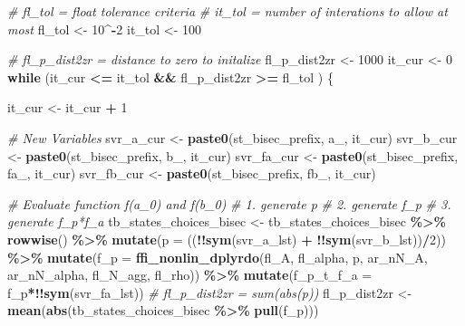 \documentclass[
]{book}
\newenvironment{Shaded}{\begin{snugshade}}{\end{snugshade}}
\newcommand{\CommentTok}[1]{\textcolor[rgb]{0.56,0.35,0.01}{\textit{#1}}}
\newcommand{\ControlFlowTok}[1]{\textcolor[rgb]{0.13,0.29,0.53}{\textbf{#1}}}
\newcommand{\DataTypeTok}[1]{\textcolor[rgb]{0.13,0.29,0.53}{#1}}
\newcommand{\DecValTok}[1]{\textcolor[rgb]{0.00,0.00,0.81}{#1}}
\newcommand{\KeywordTok}[1]{\textcolor[rgb]{0.13,0.29,0.53}{\textbf{#1}}}
\newcommand{\NormalTok}[1]{#1}
\newcommand{\OperatorTok}[1]{\textcolor[rgb]{0.81,0.36,0.00}{\textbf{#1}}}
\newcommand{\StringTok}[1]{\textcolor[rgb]{0.31,0.60,0.02}{#1}}
\begin{document}
\begin{Shaded}
\begin{Highlighting}[]
\CommentTok{\# fl\_tol = float tolerance criteria}
\CommentTok{\# it\_tol = number of interations to allow at most}
\NormalTok{fl\_tol \textless{}{-}}\StringTok{ }\DecValTok{10}\OperatorTok{\^{}{-}}\DecValTok{2}
\NormalTok{it\_tol \textless{}{-}}\StringTok{ }\DecValTok{100}

\CommentTok{\# fl\_p\_dist2zr = distance to zero to initalize}
\NormalTok{fl\_p\_dist2zr \textless{}{-}}\StringTok{ }\DecValTok{1000}
\NormalTok{it\_cur \textless{}{-}}\StringTok{ }\DecValTok{0}
\ControlFlowTok{while}\NormalTok{ (it\_cur }\OperatorTok{\textless{}=}\StringTok{ }\NormalTok{it\_tol }\OperatorTok{\&\&}\StringTok{ }\NormalTok{fl\_p\_dist2zr }\OperatorTok{\textgreater{}=}\StringTok{ }\NormalTok{fl\_tol ) \{}

\NormalTok{  it\_cur \textless{}{-}}\StringTok{ }\NormalTok{it\_cur }\OperatorTok{+}\StringTok{ }\DecValTok{1}

  \CommentTok{\# New Variables}
\NormalTok{  svr\_a\_cur \textless{}{-}}\StringTok{ }\KeywordTok{paste0}\NormalTok{(st\_bisec\_prefix, }\StringTok{\textquotesingle{}a\_\textquotesingle{}}\NormalTok{, it\_cur)}
\NormalTok{  svr\_b\_cur \textless{}{-}}\StringTok{ }\KeywordTok{paste0}\NormalTok{(st\_bisec\_prefix, }\StringTok{\textquotesingle{}b\_\textquotesingle{}}\NormalTok{, it\_cur)}
\NormalTok{  svr\_fa\_cur \textless{}{-}}\StringTok{ }\KeywordTok{paste0}\NormalTok{(st\_bisec\_prefix, }\StringTok{\textquotesingle{}fa\_\textquotesingle{}}\NormalTok{, it\_cur)}
\NormalTok{  svr\_fb\_cur \textless{}{-}}\StringTok{ }\KeywordTok{paste0}\NormalTok{(st\_bisec\_prefix, }\StringTok{\textquotesingle{}fb\_\textquotesingle{}}\NormalTok{, it\_cur)}

  \CommentTok{\# Evaluate function f(a\_0) and f(b\_0)}
  \CommentTok{\# 1. generate p}
  \CommentTok{\# 2. generate f\_p}
  \CommentTok{\# 3. generate f\_p*f\_a}
\NormalTok{  tb\_states\_choices\_bisec \textless{}{-}}\StringTok{ }\NormalTok{tb\_states\_choices\_bisec }\OperatorTok{\%\textgreater{}\%}
\StringTok{    }\KeywordTok{rowwise}\NormalTok{() }\OperatorTok{\%\textgreater{}\%}
\StringTok{    }\KeywordTok{mutate}\NormalTok{(}\DataTypeTok{p =}\NormalTok{ ((}\OperatorTok{!!}\KeywordTok{sym}\NormalTok{(svr\_a\_lst) }\OperatorTok{+}\StringTok{ }\OperatorTok{!!}\KeywordTok{sym}\NormalTok{(svr\_b\_lst))}\OperatorTok{/}\DecValTok{2}\NormalTok{)) }\OperatorTok{\%\textgreater{}\%}
\StringTok{    }\KeywordTok{mutate}\NormalTok{(}\DataTypeTok{f\_p =} \KeywordTok{ffi\_nonlin\_dplyrdo}\NormalTok{(fl\_A, fl\_alpha, p,}
\NormalTok{                                    ar\_nN\_A, ar\_nN\_alpha,}
\NormalTok{                                    fl\_N\_agg, fl\_rho)) }\OperatorTok{\%\textgreater{}\%}
\StringTok{    }\KeywordTok{mutate}\NormalTok{(}\DataTypeTok{f\_p\_t\_f\_a =}\NormalTok{ f\_p}\OperatorTok{*!!}\KeywordTok{sym}\NormalTok{(svr\_fa\_lst))}
  \CommentTok{\# fl\_p\_dist2zr = sum(abs(p))}
\NormalTok{  fl\_p\_dist2zr \textless{}{-}}\StringTok{ }\KeywordTok{mean}\NormalTok{(}\KeywordTok{abs}\NormalTok{(tb\_states\_choices\_bisec }\OperatorTok{\%\textgreater{}\%}\StringTok{ }\KeywordTok{pull}\NormalTok{(f\_p)))}


\end{Highlighting}
\end{Shaded}
\end{document}
